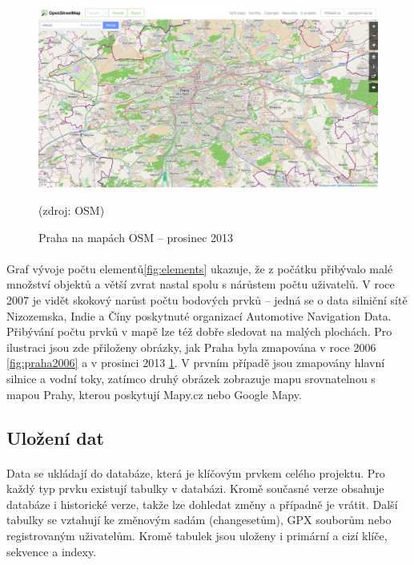 \documentclass[11pt,a4paper,titlepage,oneside]{book}
\begin{document}

		\begin{figure}[!h]
			\begin{center}
				\includegraphics[width=12cm]{obrazky/Osm-201312-praha.png}
				\caption{Praha na mapách \ac{OSM} -- prosinec 2013}(zdroj: \ac{OSM}\cite{osm_wikipedia_cs})
				\label{fig:praha2013}
			\end{center}
		\end{figure}




		\paragraph{} Graf vývoje počtu elementů\ref{fig:elements} ukazuje, že z počátku přibývalo malé množství objektů a větší zvrat nastal spolu s nárůstem počtu uživatelů. V roce 2007 je vidět skokový narůst počtu bodových prvků -- jedná se o data silniční sítě Nizozemska, Indie a Číny poskytnuté organizací Automotive Navigation Data. 
		Přibývání počtu prvků v mapě lze též dobře sledovat na malých plochách. Pro ilustraci jsou zde přiloženy obrázky, jak Praha byla zmapována v roce 2006 \ref{fig:praha2006} a v prosinci 2013 \ref{fig:praha2013}. V prvním případě jsou zmapovány hlavní silnice a vodní toky, zatímco druhý obrázek zobrazuje mapu srovnatelnou s mapou Prahy, kterou poskytují Mapy.cz nebo Google Mapy.
	
	\subsection{Uložení dat}
		\paragraph{} Data se ukládají do databáze, která je klíčovým prvkem celého projektu. Pro každý typ prvku existují tabulky v databázi. Kromě současné verze obsahuje databáze i historické verze, takže lze dohledat změny a případně je vrátit. Další tabulky se vztahují ke změnovým sadám (changesetům), GPX souborům nebo registrovaným uživatelům. Kromě tabulek jsou uloženy i primární a cizí klíče, sekvence a indexy.
\end{document}
